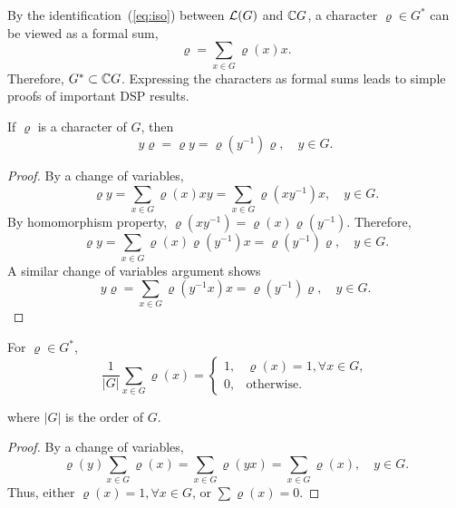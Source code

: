By the identification~(\ref{eq:iso}) between $\mathcal{L}(G)$ and
$\mathbb{C} G$, a character $\varrho \in G^*$ can be viewed as
a formal sum,
\begin{equation}
\varrho = \sum_{x\in G}\varrho(x)x.
\end{equation}
Therefore, $G^* \subset \mathbb{C} G$. 
Expressing the characters as formal sums 
leads to simple proofs of important DSP results.
\begin{theorem}\label{thm:char-action}     
If $\varrho$ is a character of $G$, then
\begin{equation}
y\varrho = \varrho y = \varrho(y^{-1})\varrho, \quad y\in G.
\end{equation}
\end{theorem}
\begin{proof}
By a change of variables,
\[
\varrho y = \sum_{x\in G}\varrho(x)xy = \sum_{x\in G}\varrho(xy^{-1})x, \quad y\in G.
\]
By homomorphism property, $\varrho(xy^{-1}) =
\varrho(x)\varrho(y^{-1})$.  Therefore, 
\[
\varrho y %
= \sum_{x\in G}\varrho(x)\varrho(y^{-1})x
= \varrho(y^{-1})\varrho, \quad y\in G.
\]
A similar change of variables argument shows
\[
y\varrho %
= \sum_{x\in G}\varrho(y^{-1}x)x
= \varrho(y^{-1})\varrho, \quad y\in G.
\]
\end{proof}
\begin{theorem}\label{thm:eigenvector}             
For $\varrho\in G^*$,
\begin{equation}
\frac{1}{|G|} \sum_{x\in G} \varrho(x) = 
\begin{cases}  1, & \varrho(x)=1, \forall x\in G,\\
0, & \text{otherwise.}
\end{cases}
\end{equation}
\end{theorem}
where $|G|$ is the order of $G$.
\begin{proof}
By a change of variables,
\begin{equation}
\varrho(y) \sum_{x\in G} \varrho(x) = \sum_{x\in G}
\varrho(yx) = \sum_{x\in G} \varrho(x), \quad y\in G.
\end{equation}
Thus, either $\varrho(x)=1, \forall x\in G$, 
or $\sum \varrho(x)=0$.
\end{proof}

